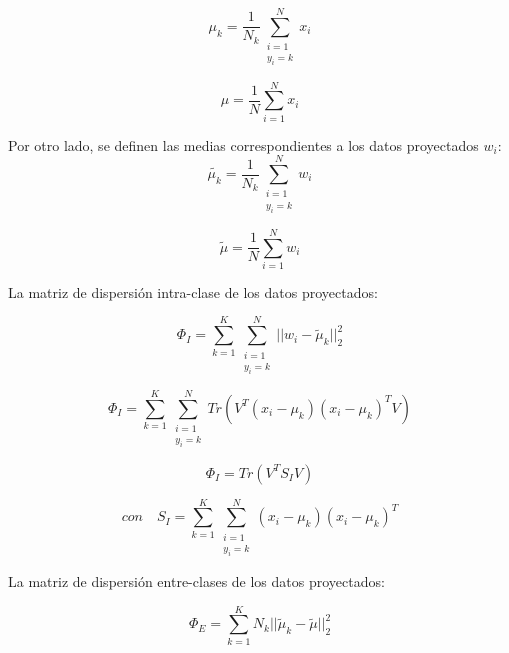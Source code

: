\begin{equation} \label{eq:18}
 	\mu_k = \frac{1}{N_{k}} 
 	\sum_{\substack{i = 1\\
                  	y_i = k}}^{N}
                  x_i
\end{equation} 


\begin{equation} \label{eq:19}
 \mu = \frac{1}{N} \sum_{i = 1}^{N} x_i
\end{equation}

Por otro lado, se definen las medias correspondientes a los datos proyectados $w_i$:
\begin{equation} \label{eq:20}
 	\widetilde{\mu_k} = \frac{1}{N_{k}} 
 	\sum_{\substack{i = 1\\
                  	y_i = k}}^{N}
                  w_i
\end{equation} 


\begin{equation} \label{eq:21}
 \widetilde{\mu} = \frac{1}{N} \sum_{i = 1}^{N} w_i
\end{equation}


La matriz de dispersión intra-clase de los datos proyectados:


$$\Phi_{I} = \sum_{k=1}^{K} 
				\sum_{\substack{i = 1\\
                  			   	y_i = k}}
                    ^{N}
           ||w_i-\widetilde{\mu}_{k}||^{2}_{2}$$


$$ \Phi_{I} =  \sum_{k=1}^{K} 
					\sum_{\substack{i = 1\\
                  			   	y_i = k}}
                    ^{N}
			Tr (V^T (x_i - \mu_k)(x_i - \mu_k)^T V ) $$

\begin{equation} \label{eq:22}
 \Phi_{I} =  Tr(V^T S_I V) 
\end{equation}



\begin{equation} \label{eq:23}
con \quad S_I = \sum_{k=1}^{K} 
					\sum_{\substack{i = 1\\
                  			   	y_i = k}}
                    ^{N}
 ({x_i-\mu_{k}})({x_i-\mu_{k}})^T 
\end{equation}



La matriz de dispersión entre-clases de los datos proyectados:

$$ \Phi_{E} = \sum_{k=1}^{K} N_{k} || \widetilde{\mu}_k - \widetilde{\mu} ||^{2}_{2} $$


